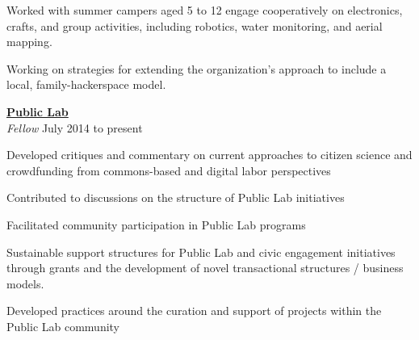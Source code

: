 \documentclass[10pt]{article}
\newcommand{\blankline}{\quad\pagebreak[3]}
\newcommand{\halfblankline}{\quad\vspace{-0.5\baselineskip}\pagebreak[3]}
\begin{document}
\halfblankline

\begin{innerlist}
\item Worked with summer campers aged 5 to 12 engage cooperatively on electronics, crafts, and group activities, including robotics, water monitoring, and aerial mapping. 
\item Working on strategies for extending the organization's approach to include a local, family-hackerspace model.
   
\end{innerlist}

\blankline


\href{http://publiclab.org}{\textbf{Public Lab}} \\
\emph{Fellow}  \hfill {July 2014 to present}

\halfblankline

\begin{innerlist}
\item Developed critiques and commentary on current approaches to citizen science and crowdfunding from commons-based and digital labor perspectives
\item Contributed to discussions on the structure of Public Lab initiatives
\item Facilitated community participation in Public Lab programs
\item Sustainable support structures for Public Lab and civic engagement initiatives through grants and the development of novel transactional structures / business models.
\item Developed practices around the curation and support of projects within the Public Lab community

\end{innerlist}
   
\blankline
\blankline
\end{document}
